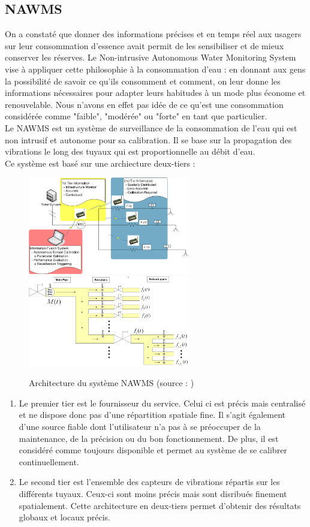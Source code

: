 \documentclass[10pt, article]{llncs}
\begin{document}
	\subsection{NAWMS}
		On a constaté que donner des informations précises et en temps réel aux usagers sur leur consommation d'essence avait permit de les sensibiliser et de mieux conserver les réserves. Le Non-intrusive Autonomous Water Monitoring System \cite{kim_nawms:_2008} vise à appliquer cette philosophie à la consommation d'eau : en donnant aux gens la possibilité de savoir ce qu'ils consomment et comment, on leur donne les informations nécessaires pour adapter leurs habitudes à un mode plus économe et renouvelable. Nous n'avons en effet pas idée de ce qu'est une consommation considérée comme "faible", "modérée" ou "forte" en tant que particulier.\\
		Le NAWMS est un système de surveillance de la consommation de l'eau qui est non intrusif et autonome pour sa calibration. Il se base sur la propagation des vibrations le long des tuyaux qui est proportionnelle au débit d'eau.\\
		Ce système est basé sur une archiecture deux-tiers :
		\begin{figure}
			\includegraphics[width=200pt]{img/nawms.png}
			\includegraphics[width=200pt]{img/nawms2.png}
			\caption{Architecture du système NAWMS (source : \cite{kim_nawms:_2008})}
		\end{figure}
		\begin{enumerate}
			\item Le premier tier est le fournisseur du service. Celui ci est précis mais centralisé et ne dispose donc pas d'une répartition spatiale fine. Il s'agit également d'une source fiable dont l'utilisateur n'a pas à se préoccuper de la maintenance, de la précision ou du bon fonctionnement. De plus, il est considéré comme toujours disponible et permet au système de se calibrer continuellement.
			\item Le second tier est l'ensemble des capteurs de vibrations répartis sur les différents tuyaux. Ceux-ci sont moins précis mais sont disribués finement spatialement. Cette architecture en deux-tiers permet d'obtenir des résultats globaux et locaux précis.
		\end{enumerate}
\end{document}
